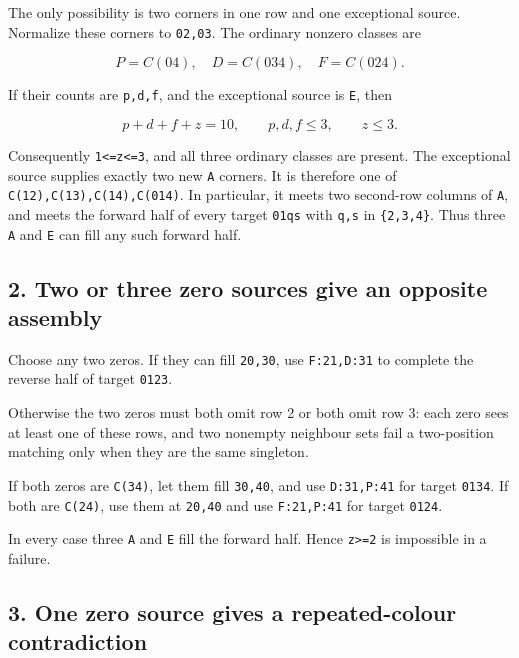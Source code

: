 \documentclass[
  10pt,
]{article}
\begin{document}
The only possibility is two corners in one row and one exceptional
source. Normalize these corners to \texttt{02,03}. The ordinary nonzero
classes are

\[
P=C(04),\quad D=C(034),\quad F=C(024).
\]

If their counts are \texttt{p,d,f}, and the exceptional source is
\texttt{E}, then

\[
p+d+f+z=10,\qquad p,d,f\le3,\qquad z\le3.
\]

Consequently \texttt{1\textless{}=z\textless{}=3}, and all three
ordinary classes are present. The exceptional source supplies exactly
two new \texttt{A} corners. It is therefore one of
\texttt{C(12),C(13),C(14),C(014)}. In particular, it meets two
second-row columns of \texttt{A}, and meets the forward half of every
target \texttt{01\textbar{}qs} with \texttt{q,s} in \texttt{\{2,3,4\}}.
Thus three \texttt{A} and \texttt{E} can fill any such forward half.

\hypertarget{two-or-three-zero-sources-give-an-opposite-assembly}{%
\subsection*{2. Two or three zero sources give an opposite
assembly}\label{two-or-three-zero-sources-give-an-opposite-assembly}}

Choose any two zeros. If they can fill \texttt{20,30}, use
\texttt{F:21,D:31} to complete the reverse half of target
\texttt{01\textbar{}23}.

Otherwise the two zeros must both omit row 2 or both omit row 3: each
zero sees at least one of these rows, and two nonempty neighbour sets
fail a two-position matching only when they are the same singleton.

If both zeros are \texttt{C(34)}, let them fill \texttt{30,40}, and use
\texttt{D:31,P:41} for target \texttt{01\textbar{}34}. If both are
\texttt{C(24)}, use them at \texttt{20,40} and use \texttt{F:21,P:41}
for target \texttt{01\textbar{}24}.

In every case three \texttt{A} and \texttt{E} fill the forward half.
Hence \texttt{z\textgreater{}=2} is impossible in a failure.

\hypertarget{one-zero-source-gives-a-repeated-colour-contradiction}{%
\subsection*{3. One zero source gives a repeated-colour
contradiction}\label{one-zero-source-gives-a-repeated-colour-contradiction}}
\end{document}
